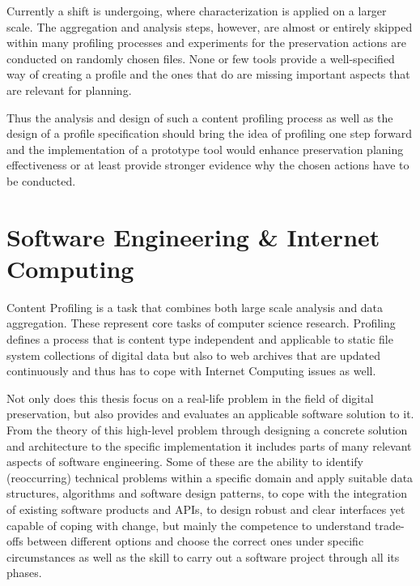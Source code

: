 \documentclass[a4paper,12pt]{scrartcl} %
\begin{document}
Currently a shift is undergoing, where characterization is applied on a larger scale. The aggregation and analysis steps, however, are almost or entirely skipped within many profiling processes and experiments for the preservation actions are conducted on randomly chosen files. None or few tools provide a well-specified way of creating a profile and the ones that do are missing important aspects that are relevant for planning.

Thus the analysis and design of such a content profiling process as well as the design of a profile specification should bring the idea of profiling one step forward and the implementation of a prototype tool would enhance preservation planing effectiveness or at least provide stronger evidence why the chosen actions have to be conducted.

\section*{Software Engineering \& Internet Computing}
Content Profiling is a task that combines both large scale analysis and data aggregation. These represent core tasks of computer science research. Profiling defines a process that is content type independent and applicable to static file system collections of digital data but also to web archives that are updated continuously and thus has to cope with Internet Computing issues as well.

Not only does this thesis focus on a real-life problem in the field of digital preservation, but also provides and evaluates an applicable software solution to it. From the theory of this high-level problem through designing a concrete solution and architecture to the specific implementation it includes parts of many relevant aspects of software engineering. Some of these are the ability to identify (reoccurring) technical problems within a specific domain and apply suitable data structures, algorithms and software design patterns, to cope with the integration of existing software products and APIs, to design robust and clear interfaces yet capable of coping with change, but mainly the competence to understand trade-offs between different options and choose the correct ones under specific circumstances as well as the skill to carry out a software project through all its phases.



\end{document}
